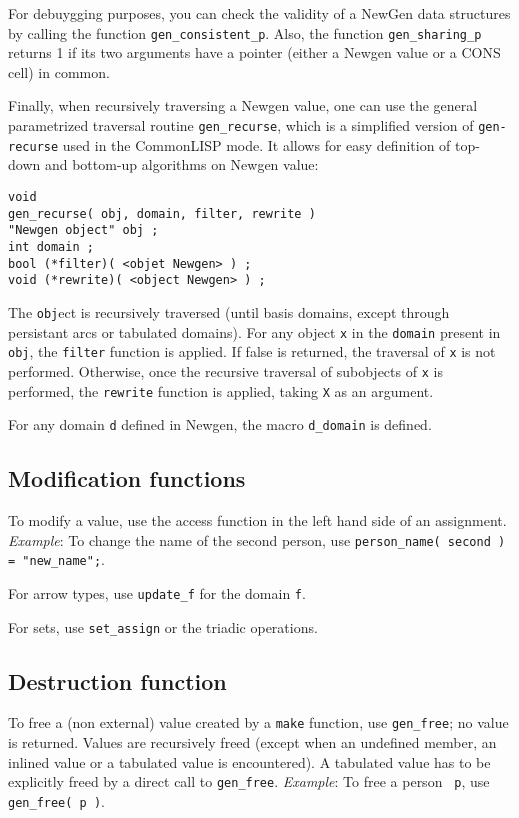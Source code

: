 For debuygging purposes, you can check the validity of a NewGen data
structures by calling the function {\tt gen\_consistent\_p}.  Also,
the function {\tt gen\_sharing\_p} returns 1 if its two arguments have
a pointer (either a Newgen value or a CONS cell) in common.

Finally, when recursively traversing a Newgen value, one can use the
general parametrized traversal routine {\tt gen\_recurse}, which is a
simplified version of {\tt gen-recurse} used in the CommonLISP mode.
It allows for easy definition of top-down and bottom-up algorithms on
Newgen value:

\begin{verbatim}
void
gen_recurse( obj, domain, filter, rewrite )
"Newgen object" obj ;
int domain ;
bool (*filter)( <objet Newgen> ) ;
void (*rewrite)( <object Newgen> ) ;
\end{verbatim}

The {\tt obj}ect is recursively traversed (until basis domains, except
through persistant arcs or tabulated domains).  For any object {\tt x}
in the {\tt domain} present in {\tt obj}, the {\tt filter} function is
applied.  If false is returned, the traversal of {\tt x} is not
performed.  Otherwise, once the recursive traversal of subobjects of
{\tt x} is performed, the {\tt rewrite} function is applied, taking
{\tt X} as an argument.

For any domain {\tt d} defined in Newgen, the macro {\tt d\_domain} is
defined.

\subsection{Modification functions}

To modify a value, use the access function in the left hand side of an
assignment. 
{\em Example}: To change the name of the second person, use
{\tt person\_name( second ) = "new\_name";}.

For arrow types, use {\tt update\_f} for the domain {\tt f}.

For sets, use {\tt set\_assign} or the triadic operations.

\subsection{Destruction function}

To free a (non external) value created by a {\tt make} function, use
{\tt gen\_free}; no value is returned. Values are recursively freed
(except when an undefined member, an inlined value or a tabulated value
is encountered). A tabulated value has to be explicitly freed by a
direct call to {\tt gen\_free}.  {\em Example}: To free a person {\tt
p}, use {\tt gen\_free( p )}.

